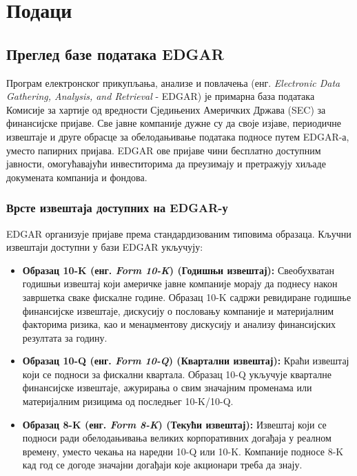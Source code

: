 \chapter{Подаци}
\label{sec:3}

\section{Преглед базе података EDGAR}
\label{secsec:3}

Програм електронског прикупљања, анализе и повлачења (енг. \textit{Electronic Data Gathering, Analysis, and Retrieval} - EDGAR) је примарна база података Комисије за хартије од вредности Сједињених Америчких Држава (SEC) за финансијске пријаве. Све јавне компаније дужне су да своје изјаве, периодичне извештаје и друге обрасце за обелодањивање података подносе путем EDGAR-а, уместо папирних пријава. EDGAR ове пријаве чини бесплатно доступним јавности, омогућавајући инвеститорима да преузимају и претражују хиљаде докумената компанија и фондова.

\subsection{Врсте извештаја доступних на EDGAR-у}

EDGAR организује пријаве према стандардизованим типовима образаца. Кључни извештаји доступни у бази EDGAR укључују:

\begin{itemize}
\item \textbf{Образац 10-K (енг. \textit{Form 10-K}) (Годишњи извештај):} Свеобухватан годишњи извештај који америчке јавне компаније морају да поднесу након завршетка сваке фискалне године. Образац 10-K садржи ревидиране годишње финансијске извештаје, дискусију о пословању компаније и материјалним факторима ризика, као и менаџментову дискусију и анализу финансијских резултата за годину.

\item \textbf{Образац 10-Q (енг. \textit{Form 10-Q}) (Квартални извештај):} Краћи извештај који се подноси за фискални квартала. Образац 10-Q укључује кварталне финансијске извештаје, ажурирања о свим значајним променама или материјалним ризицима од последњег 10-K/10-Q.

\item \textbf{Образац 8-K (енг. \textit{Form 8-K}) (Текући извештај):} Извештај који се подноси ради обелодањивања великих корпоративних догађаја у реалном времену, уместо чекања на наредни 10-Q или 10-K. Компаније подносе 8-K кад год се догоде значајни догађаји које акционари треба да знају.
\end{itemize}

